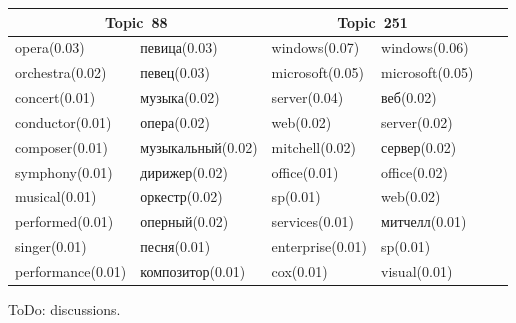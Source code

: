 \documentclass[russian]{llncs}
\begin{document}
\begin{table}
\begin{tabular}{|l|l||l|l||l|l|}
    	\multicolumn{2}{|c||}{\textbf{Topic~88}} & \multicolumn{2}{c||}{\textbf{Topic~251}} \\
    	\hline
        opera(0.03) & певица(0.03) & windows(0.07) & windows(0.06) \\
    	orchestra(0.02) & певец(0.03) & microsoft(0.05) & microsoft(0.05) \\
    	concert(0.01) & музыка(0.02) & server(0.04) & веб(0.02) \\
    	conductor(0.01) & опера(0.02) & web(0.02) & server(0.02) \\
    	composer(0.01) & музыкальный(0.02) & mitchell(0.02) & сервер(0.02)\\
    	symphony(0.01) & дирижер(0.02) & office(0.01) & office(0.02)\\
    	musical(0.01) & оркестр(0.02) & sp(0.01) & web(0.02)\\
    	performed(0.01) & оперный(0.02) & services(0.01) &  митчелл(0.01) \\
    	singer(0.01) & песня(0.01) & enterprise(0.01) & sp(0.01) \\
    	performance(0.01) & композитор(0.01) & cox(0.01) & visual(0.01) \\
      	\hline
	\end{tabular}
\end{table}

{\color{red}ToDo: discussions.}
\end{document}

